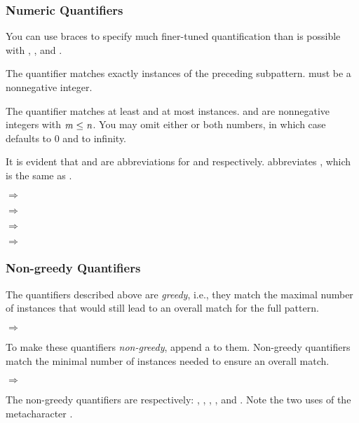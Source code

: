 \subsubsection {Numeric Quantifiers}

You can use braces to specify much finer-tuned quantification than is
possible with \code{*}, \code{+}, and .

The quantifier  matches exactly  instances of
the preceding subpattern.   must be a nonnegative integer.

The quantifier  matches at least  and
at most  instances.   and  are nonnegative
integers with $\var{m} \le \var{n}$.  You may omit either or both
numbers, in which case  defaults to 0 and  to infinity.

It is evident that \code{+} and  are abbreviations for
 and  respectively.  \code{*} abbreviates
\code{\{,\}}, which is the same as .

 $\Rightarrow$

 $\Rightarrow$ 

 $\Rightarrow$

 $\Rightarrow$

\subsubsection {Non-greedy Quantifiers}

The quantifiers described above are \emph{greedy}, i.e., they match
the maximal number of instances that would still lead to an overall
match for the full pattern.

 $\Rightarrow$

To make these quantifiers \emph{non-greedy}, append a  to
them.  Non-greedy quantifiers match the minimal number of instances
needed to ensure an overall match.

 $\Rightarrow$

The non-greedy quantifiers are respectively: , ,
, , and .  Note
the two uses of the metacharacter .

